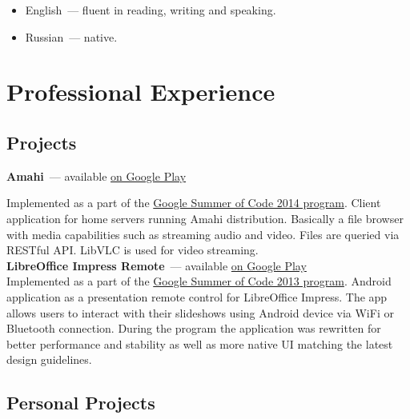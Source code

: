     \begin{itemize}

      \item English~--- fluent in reading, writing and speaking.

      \item Russian~--- native.

    \end{itemize}


  \section*{Professional Experience}

    \subsection*{Projects}

      \textbf{Amahi}~--- available \href{https://play.google.com/store/apps/details?id=org.amahi.anywhere}{on Google Play}

        Implemented as a part of the \href{https://developers.google.com/open-source/soc}{Google Summer of Code 2014 program}.
        Client application for home servers running Amahi distribution.
        Basically a file browser with media capabilities such as streaming audio and video.
        Files are queried via RESTful API. LibVLC is used for video streaming. \\

      \textbf{LibreOffice Impress Remote}~--- available \href{https://play.google.com/store/apps/details?id=org.libreoffice.impressremote}{on Google Play} \\

        Implemented as a part of the \href{https://developers.google.com/open-source/soc}{Google Summer of Code 2013 program}.
        Android application as a presentation remote control for LibreOffice Impress.
        The app allows users to interact with their slideshows using Android device
        via WiFi or Bluetooth connection. During the program the application was
        rewritten for better performance and stability as well as more native
        UI matching the latest design guidelines. \\

    \subsection*{Personal Projects}


